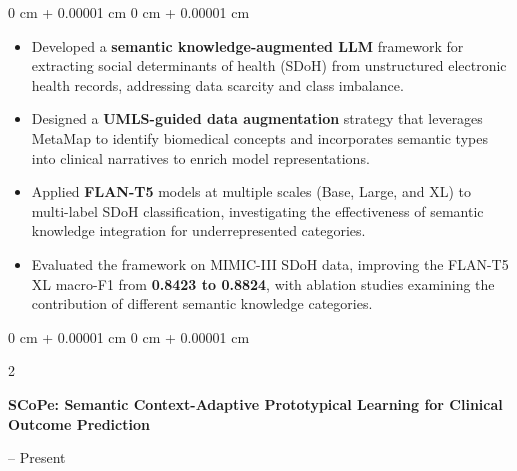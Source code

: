 \documentclass[10pt, letterpaper]{article}
\newenvironment{highlights}{
    \begin{itemize}[
        topsep=0.10 cm,
        parsep=0.10 cm,
        partopsep=0pt,
        itemsep=0pt,
        leftmargin=0 cm + 10pt
    ]
}{
    \end{itemize}
} %
\newenvironment{onecolentry}{
    \begin{adjustwidth}{
        0 cm + 0.00001 cm
    }{
        0 cm + 0.00001 cm
    }
}{
    \end{adjustwidth}
} %
\newenvironment{twocolentry}[2][]{
    \onecolentry
    \def\secondColumn{#2}
    \setcolumnwidth{\fill, 4.5 cm}
    \begin{paracol}{2}
}{
    \switchcolumn \raggedleft \secondColumn
    \end{paracol}
    \endonecolentry
} %
\begin{document}
\vspace{0.05 cm}
\begin{onecolentry}
    \begin{highlights}
        \item Developed a \textbf{semantic knowledge-augmented LLM} framework for extracting social determinants of health (SDoH) from unstructured electronic health records, addressing data scarcity and class imbalance.

        \item Designed a \textbf{UMLS-guided data augmentation} strategy that leverages MetaMap to identify biomedical concepts and incorporates semantic types into clinical narratives to enrich model representations.

        \item Applied \textbf{FLAN-T5} models at multiple scales (Base, Large, and XL) to multi-label SDoH classification, investigating the effectiveness of semantic knowledge integration for underrepresented categories.

        \item Evaluated the framework on MIMIC-III SDoH data, improving the FLAN-T5 XL macro-F1 from \textbf{0.8423 to 0.8824}, with ablation studies examining the contribution of different semantic knowledge categories.

    \end{highlights}
\end{onecolentry}


\begin{twocolentry}{
    2026 -- Present
}
    \textbf{SCoPe: Semantic Context-Adaptive Prototypical Learning for Clinical Outcome Prediction}
\end{twocolentry}
\end{document}
